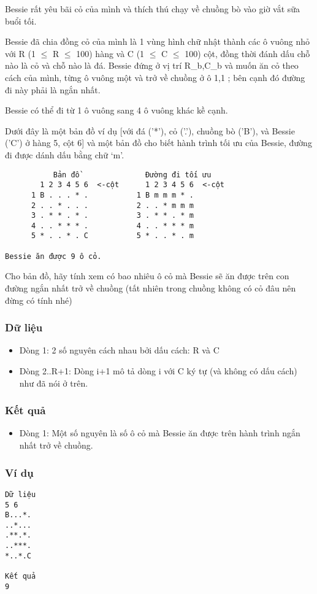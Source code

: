 



   Bessie rất yêu bãi cỏ của mình và thích thú chạy về chuồng bò vào  giờ vắt sữa buổi tối.  

   Bessie đã chia đồng cỏ của mình là 1 vùng hình chữ nhật thành  các ô vuông nhỏ với R (1  $\le$  R  $\le$  100) hàng và C (1  $\le$  C  $\le$  100) cột,  đồng thời đánh dấu chỗ nào là cỏ và chỗ nào là đá. Bessie đứng ở vị  trí R\_b,C\_b và muốn ăn cỏ theo cách của mình, từng ô vuông một và  trở về chuồng ở ô 1,1 ; bên cạnh đó đường đi này phải là ngắn nhất.  

   Bessie có thể đi từ 1 ô vuông sang 4 ô vuông khác kề cạnh.  

   Dưới đây là một bản đồ ví dụ [với đá ('*'), cỏ ('.'),  chuồng bò ('B'),  và Bessie ('C') ở hàng 5, cột 6] và một bản đồ cho biết hành trình  tối ưu của Bessie, đường đi được dánh dấu bằng chữ ‘m’.  
\begin{verbatim}
           Bản đồ               Đường đi tối ưu
        1 2 3 4 5 6  <-cột      1 2 3 4 5 6  <-cột
      1 B . . . * .           1 B m m m * .
      2 . . * . . .           2 . . * m m m
      3 . * * . * .           3 . * * . * m
      4 . . * * * .           4 . . * * * m
      5 * . . * . C           5 * . . * . m

Bessie ăn được 9 ô cỏ.
\end{verbatim}

   Cho bản đồ, hãy tính xem có bao nhiêu ô cỏ mà Bessie sẽ ăn được trên  con đường ngắn nhất trở về chuồng (tất nhiên trong chuồng không có  cỏ đâu nên đừng có tính nhé)  

\subsubsection{   Dữ liệu  }
\begin{itemize}
	\item     Dòng 1: 2 số nguyên cách nhau bởi dấu cách: R và C   
	\item     Dòng 2..R+1: Dòng i+1 mô tả dòng i với C ký tự (và không có dấu          cách) như đã nói ở trên.   
\end{itemize}

\subsubsection{   Kết quả  }
\begin{itemize}
	\item     Dòng 1: Một số nguyên là số ô cỏ mà Bessie ăn được trên hành        trình ngắn nhất trở về chuồng.   
\end{itemize}

\subsubsection{   Ví dụ  }
\begin{verbatim}
Dữ liệu
5 6
B...*.
..*...
.**.*.
..***.
*..*.C

Kết quả
9
\end{verbatim}
